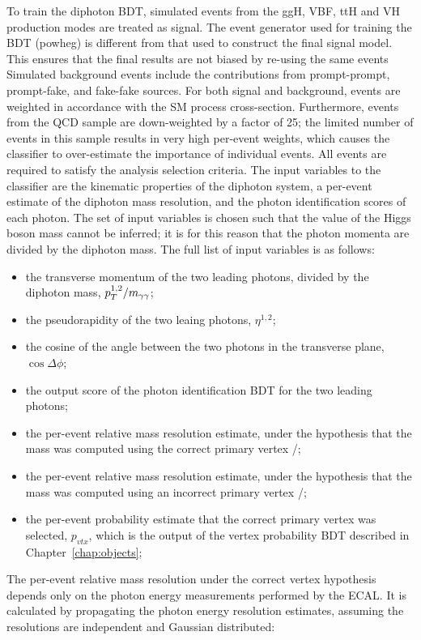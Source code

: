 To train the diphoton BDT, simulated events from the ggH, VBF, ttH 
and VH production modes are treated as signal. 
The event generator used for training the BDT (powheg) is different from that used to construct
the final signal model.
This ensures that the final results are not biased by re-using the same events
Simulated background events include the contributions from prompt-prompt, prompt-fake, 
and fake-fake sources.
For both signal and background, 
events are weighted in accordance with the SM process cross-section.
Furthermore, events from the QCD sample are down-weighted by a factor of 25;
the limited number of events in this sample results in very high per-event weights, 
which causes the classifier to over-estimate the importance of individual events.
All events are required to satisfy the analysis selection criteria.
The input variables to the classifier are the kinematic properties of the diphoton system, 
a per-event estimate of the diphoton mass resolution, 
and the photon identification scores of each photon.
The set of input variables is chosen such that the value of the Higgs boson mass cannot be inferred;
it is for this reason that the photon momenta are divided by the diphoton mass.
The full list of input variables is as follows:
\begin{itemize}
\item the transverse momentum of the two leading photons, divided by the diphoton mass, $p_T^{1,2}/m_{\gamma\gamma}$;
\item the pseudorapidity of the two leaing photons, $\eta^{1,2}$;
\item the cosine of the angle between the two photons in the transverse plane, $\cos{\Delta\phi}$;
\item the output score of the photon identification BDT for the two leading photons;
\item the per-event relative mass resolution estimate, 
      under the hypothesis that the mass was computed using the correct primary vertex \srv/\mgg;
\item the per-event relative mass resolution estimate, 
      under the hypothesis that the mass was computed using an incorrect primary vertex \swv/\mgg;
\item the per-event probability estimate that the correct primary vertex was selected, $p_{vtx}$,
      which is the output of the vertex probability BDT described in Chapter~\ref{chap:objects};
\end{itemize}

The per-event relative mass resolution under the correct vertex hypothesis 
depends only on the photon energy measurements performed by the ECAL.
It is calculated by propagating the photon energy resolution estimates, 
assuming the resolutions are independent and Gaussian distributed:

